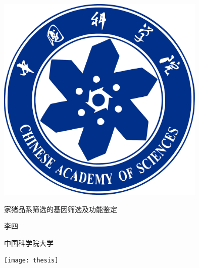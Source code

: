 \documentclass[zihao = -4]{ctexart}
\newlength{\colpad}
\newcommand{\colwidth}{\ccwd}
\newcommand{\miniwidth}{210mm}
\newcommand{\logowidth}{100mm}
\newcommand{\vertmargin}{30mm}
\begin{document}
\centering
\begin{minipage}[b][\textheight][b]{\miniwidth}
	\vspace*{\fill}\par
	\centerline{\includegraphics[width = \logowidth]{caslogo}}\par
	\vspace*{\fill}\par
\end{minipage}
\hspace{\colpad}
\begin{minipage}[b][\textheight][b]{\colwidth}
	\bfseries\linespread{1}\selectfont
	\vspace*{\vertmargin}\par
	家猪品系筛选的基因筛选及功能鉴定\par\vfill
	李四\par{\vfill}中国科学院大学\par
	\vspace*{\vertmargin}\par
\end{minipage}
\hspace{\colpad}
\begin{minipage}[b][\textheight][b]{\miniwidth}
	\texttt{[image: thesis]}
\end{minipage}
\end{document}
